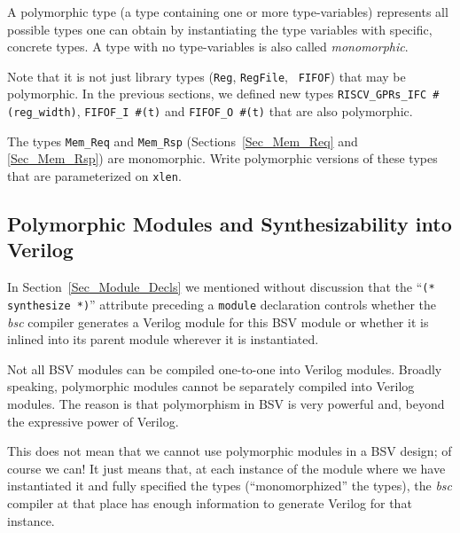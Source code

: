 A polymorphic type (a type containing one or more type-variables)
represents all possible types one can obtain by instantiating the type
variables with specific, concrete types.  A type with no
type-variables is also called \emph{monomorphic}.

Note that it is not just library types ({\tt Reg}, {\tt RegFile}, {\tt
FIFOF}) that may be polymorphic.  In the previous sections, we defined
new types \verb|RISCV_GPRs_IFC #(reg_width)|, \verb|FIFOF_I #(t)| and
\verb|FIFOF_O #(t)| that are also polymorphic.

\hdivider

\Exercise

The types {\tt Mem\_Req} and {\tt Mem\_Rsp}
(Sections~\ref{Sec_Mem_Req} and \ref{Sec_Mem_Rsp}) are monomorphic.
Write polymorphic versions of these types that are parameterized on
{\tt xlen}.

\Endexercise


\subsection{Polymorphic Modules and Synthesizability into Verilog}

\label{Sec_Polymorphic_Types_and_Synthesizability}


In Section~\ref{Sec_Module_Decls} we mentioned without discussion that
the ``{\tt (* synthesize *)}'' attribute preceding a {\tt module}
declaration controls whether the \emph{bsc} compiler generates a
Verilog module for this BSV module or whether it is inlined into its
parent module wherever it is instantiated.

Not all BSV modules can be compiled one-to-one into Verilog modules.
Broadly speaking, polymorphic modules cannot be separately compiled
into Verilog modules.  The reason is that polymorphism in BSV is very
powerful and, beyond the expressive power of Verilog.

This does not mean that we cannot use polymorphic modules in a BSV
design; of course we can!  It just means that, at each instance of the
module where we have instantiated it and fully specified the types
(``monomorphized'' the types), the \emph{bsc} compiler at that place
has enough information to generate Verilog for that instance.

